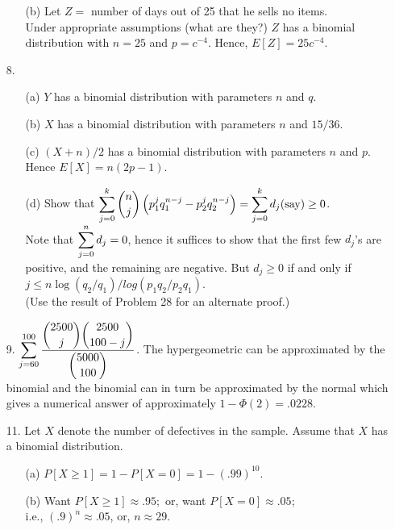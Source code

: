 \begin{enumerate}
\begin{enumerate}
		\item[(b)] Let $Z =$ number of days out of 25 that he sells no items. \\
		Under appropriate assumptions (what are they?) $Z$ has a binomial distribution with $n=25$ and $p=c^{-4}$.  Hence, $E[Z] = 25c^{-4}$.
	
	\end{enumerate}
	
	\item[8.] \begin{enumerate}
		\item[(a)] $Y$ has a binomial distribution with parameters $n$ and $q$.
		
		\item[(b)] $X$ has a binomial distribution with parameters $n$ and $15/36$.
		
		\item[(c)] $(X+n)/2$ has a binomial distribution with parameters $n$ and $p$. \\
		Hence $E[X] = n(2p-1)$.
		
		\item[(d)] Show that $\displaystyle \sum_{j=0}^{k} {n\choose j}\left(p_1^jq_1^{n-j} - p_2^jq_2^{n-j}\right) = \sum_{j=0}^{k}d_j(\text{say}) \ge 0$. \\
		Note that $\displaystyle \sum_{j=0}^{n} d_j =0$, hence it suffices to show that the first few $d_j$'s are positive, and the remaining are negative.  But $d_j \ge 0$ if and only if \\ $j\le n\log(q_2/q_1)/log(p_1q_2/p_2q_1)$. \\
		(Use the result of Problem 28 for an alternate proof.)
		
	\end{enumerate}
	
	\item[9.] $\displaystyle \sum_{j=60}^{100} \dfrac{\displaystyle {2500 \choose j}{2500 \choose {100-j}}}{\displaystyle {5000\choose 100}}$.  The hypergeometric can be approximated by the binomial and the binomial can in turn be approximated by the normal which gives a numerical answer of approximately $1- \Phi(2) = .0228$.
		
	\item[11.] Let $X$ denote the number of defectives in the sample.  Assume that $X$ has a binomial distribution. \begin{enumerate}
		\item[(a)] $P[X\ge 1] = 1 - P[X=0] = 1 - (.99)^{10}$.
		\item[(b)] Want $P[X\ge 1]\approx .95;$ or, want $P[X=0] \approx .05$; \\
		i.e., $(.9)^n \approx .05$, or, $n\approx 29$.
	\end{enumerate}
	

\end{enumerate}

